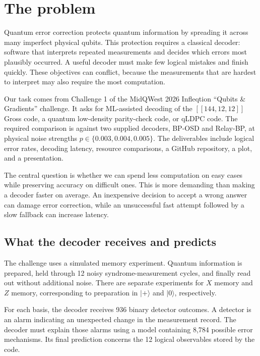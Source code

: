 \section{The problem}

Quantum error correction protects quantum information by spreading it across many imperfect physical qubits. This protection requires a classical decoder: software that interprets repeated measurements and decides which errors most plausibly occurred. A useful decoder must make few logical mistakes and finish quickly. These objectives can conflict, because the measurements that are hardest to interpret may also require the most computation.

Our task comes from Challenge 1 of the MidQWest 2026 Infleqtion ``Qubits \& Gradients'' challenge. It asks for ML-assisted decoding of the $[[144,12,12]]$ Gross code, a quantum low-density parity-check code, or qLDPC code. The required comparison is against two supplied decoders, BP-OSD and Relay-BP, at physical noise strengths
$p \in \{0.003,0.004,0.005\}$.
The deliverables include logical error rates, decoding latency, resource comparisons, a GitHub repository, a plot, and a presentation.

The central question is whether we can spend less computation on easy cases while preserving accuracy on difficult ones. This is more demanding than making a decoder faster on average. An inexpensive decision to accept a wrong answer can damage error correction, while an unsuccessful fast attempt followed by a slow fallback can increase latency.

\subsection{What the decoder receives and predicts}

The challenge uses a simulated memory experiment. Quantum information is prepared, held through 12 noisy syndrome-measurement cycles, and finally read out without additional noise. There are separate experiments for $X$ memory and $Z$ memory, corresponding to preparation in $|+\rangle$ and $|0\rangle$, respectively.

For each basis, the decoder receives 936 binary detector outcomes. A detector is an alarm indicating an unexpected change in the measurement record. The decoder must explain those alarms using a model containing 8,784 possible error mechanisms. Its final prediction concerns the 12 logical observables stored by the code.

